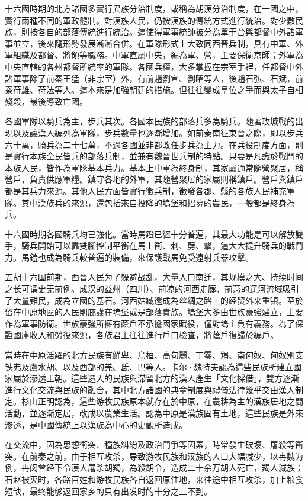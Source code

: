 十六國時期的北方諸國多實行異族分治制度，或稱為胡漢分治制度，在一國之中，實行兩種不同的軍政體制。對漢族人民，仍按漢族的傳統方式進行統治。對少數民族，則按各自的部落傳統進行統治。這使得軍事統帥被分為單于台與都督中外諸軍事並立，後來隨形勢發展漸漸合併。在軍隊形式上大致同西晉兵制，具有中軍、外軍組織及都督、將領等職務。中軍直屬中央，編為軍、營，主要保衛京師；外軍為中央直轄的各州都督所統率的軍隊。各國兵權，大多掌握在宗室手裡，任都督中外諸軍事除了前秦王猛（非宗室）外，有前趙劉宣、劉曜等人，後趙石弘、石斌，前秦苻雄、苻法等人。這本來是加強朝廷的措施。但往往變成皇位之爭而與太子自相殘殺，最後導致亡國。

各國軍隊以騎兵為主，步兵其次。各國本民族的部落兵多為騎兵。隨著攻城戰的出現以及讓漢人編列為軍隊，步兵數量也逐漸增加。如前秦南征東晉之際，即以步兵六十萬，騎兵為二十七萬，不過各國並非都改任步兵為主力。在兵役制度方面，則是實行本族全民皆兵的部落兵制，並兼有魏晉世兵制的特點。只要是凡識於戰鬥的本族人民，皆作為軍隊基本兵力。基本上中軍為終身制，其家屬通常隨營聚居，稱營戶，負責供應軍糧。鎮守各地的外軍，其隨營聚居的家屬則稱鎮戶。營戶與鎮戶都是其兵力來源。其他人民方面皆實行徵兵制，徵發各郡、縣的各族人民補充軍隊。其中漢族兵的來源，還包括來自投降的塢堡和招募的農民，一般都是終身為兵。

十六國時期各國騎兵均已強化。當時馬蹬已經十分普遍，其最大功能是可以解放雙手，騎兵開始可以靠雙腳控制平衡在馬上衝、刺、劈、擊，這大大提升騎兵的戰鬥力。馬鎧也成為騎兵較普遍的裝備，來保護戰馬免受遠射兵器攻擊。

五胡十六国前期，西晉人民为了躲避战乱，大量人口南迁，其规模之大、持续时间之长可谓史无前例。成汉的益州（四川）、前凉的河西走廊、前燕的辽河流域吸引了大量難民，成為立國的基石。河西姑臧還成為丝绸之路上的经贸外来重镇。至於留在中原地區的人民則庇護在塢堡或是部落貴族。塢堡大多由世族豪強建立，主要作為軍事防衛。世族豪強所擁有蔭戶不承擔國家賦役，僅對塢主負有義務。為了保證國庫收入和勞役來源，各族君主往往進行戶口檢查，將蔭戶復歸於編戶。

當時在中原活躍的北方民族有鮮卑、烏桓、高句麗、丁零、羯、南匈奴、匈奴別支铁弗及盧水胡、以及西部的羌、氐、巴等人。卡尔·魏特夫認為這些民族所建立國家屬於滲透王朝。這些遷入的民族與滯留北方的漢人產生「文化採借」，雙方逐漸進行文化交流與民族的融合，其中北方諸國的典章制度與禮儀法律幾乎交由漢人制定。杉山正明認為，這些游牧民族原本就存在於中原，在農耕為主的漢族居地之間活動，並逐漸定居，改成以農業生活。認為中原是漢族固有土地，這些民族是外來滲透，是中國傳統上以漢族為中心的史觀所造成。

在交流中，因為思想衝突、種族糾紛及政治鬥爭等因素，時常發生破壞、屠殺等衝突。在前秦之前，由于相互攻杀，导致游牧民族和汉族的人口大幅减少，以冉魏为例，冉闵曾经下令漢人屠杀胡羯，為殺胡令，造成二十余万胡人死亡，羯人滅族；石赵被灭时，各路百姓和游牧民族各自返回原住地，来往途中相互攻杀，加上粮食短缺，最终能够返回家乡的只有出发时的十分之三不到。

